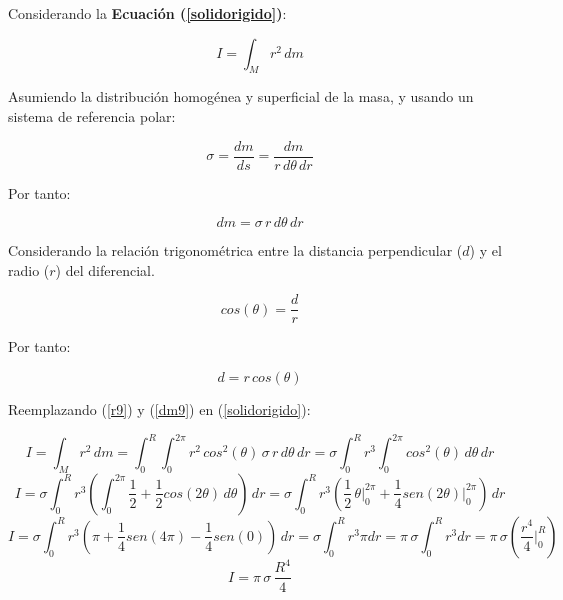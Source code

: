 \documentclass[letter,oneside,11pt]{article}
\begin{document}
Considerando la \textbf{Ecuación (\ref{solidorigido})}:

\begin{equation*}
    I = \int_{M} r^2\, dm
\tag{4}
\end{equation*}

Asumiendo la distribución homogénea y superficial de la masa, y usando un
sistema de referencia polar:

\begin{equation*}
    \sigma = \frac{dm}{ds} = \frac{dm}{r\, d\theta\, dr}
\end{equation*}

Por tanto:

\begin{equation}
    dm = \sigma\, r\, d\theta\, dr
\label{dm9}
\end{equation}

Considerando la relación trigonométrica entre la distancia perpendicular ($d$) y
el radio ($r$) del diferencial.

\begin{equation*}
    cos (\theta) = \frac{d}{r}
\end{equation*}

Por tanto:

\begin{equation}
    d = r\, cos(\theta)
\label{r9}
\end{equation}

Reemplazando (\ref{r9}) y (\ref{dm9}) en (\ref{solidorigido}): 

\begin{equation*}
    I = \int_{M} r^2\, dm = \int_{0}^{R} \int_{0}^{2\pi} r^2\, cos^2(\theta)\, \sigma\, r\, d\theta\, dr = \sigma \int_{0}^{R} r^3 \int_{0}^{2\pi} cos^2(\theta)\, d\theta\, dr
\end{equation*}
\begin{equation*}
    I = \sigma \int_{0}^{R} r^3 \left( \int_{0}^{2\pi} \frac{1}{2} + \frac{1}{2} cos(2\theta) \, d\theta \right) \, dr = \sigma \int_{0}^{R} r^3 \left( \frac{1}{2}\, \theta \Biggr|_{0}^{2\pi} + \frac{1}{4} sen(2\theta) \Biggr|_{0}^{2\pi} \right) \, dr 
\end{equation*}
\begin{equation*}
    I = \sigma \int_{0}^{R} r^3 \left( \pi + \frac{1}{4} sen(4\pi) - \frac{1}{4} sen(0) \right) \, dr = \sigma \int_{0}^{R} r^3 \pi dr = \pi\, \sigma \int_{0}^{R} r^3 dr = \pi\, \sigma \left( \frac{r^4}{4} \Biggr|_{0}^{R} \right)
\end{equation*}
\begin{equation}
    I = \pi\, \sigma\, \frac{R^4}{4}
\label{resultado9}
\end{equation}
\end{document}
